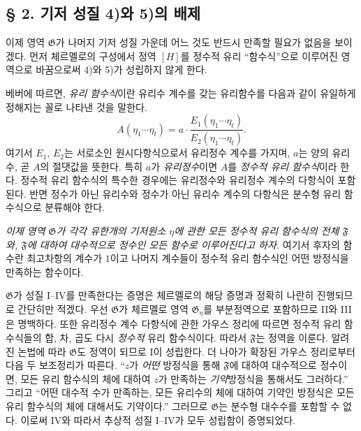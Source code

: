 \subsection*{§ 2. 기저 성질 4)와 5)의 배제}

이제 영역 $\mathfrak G$가 나머지 기저 성질 가운데 어느 것도 반드시 만족할 필요가 없음을 보이겠다. 먼저 체르멜로의 구성에서 정역 $[H]$를 정수적 유리 ``함수식''으로 이루어진 영역으로 바꿈으로써 4)와 5)가 성립하지 않게 한다.

베버에 따르면, \emph{유리 함수식}이란 유리수 계수를 갖는 유리함수를 다음과 같이 유일하게 정해지는 꼴로 나타낸 것을 말한다.
\[
 A(\eta_1\cdots \eta_t)
   = a\cdot\frac{E_1(\eta_1\cdots \eta_t)}{E_2(\eta_1\cdots \eta_t)}.
\]
여기서 $E_1$, $E_2$는 서로소인 원시다항식으로서 유리정수 계수를 가지며, $a$는 양의 유리수, 곧 $A$의 절댓값을 뜻한다. 특히 $a$가 \emph{유리정수}이면 $A$를 \emph{정수적 유리 함수식}이라 한다. 정수적 유리 함수식의 특수한 경우에는 유리정수와 유리정수 계수의 다항식이 포함된다. 반면 정수가 아닌 유리수와 정수가 아닌 유리수 계수의 다항식은 분수형 유리 함수식으로 분류해야 한다.

\emph{이제 영역 $\mathfrak G$가 각각 유한개의 기저원소 $\eta$에 관한 모든 정수적 유리 함수식의 전체 $\mathfrak F$와, $\mathfrak F$에 대하여 대수적으로 정수인 모든 함수로 이루어진다고 하자.} 여기서 후자의 함수란 최고차항의 계수가 $1$이고 나머지 계수들이 정수적 유리 함수식인 어떤 방정식을 만족하는 함수이다.

$\mathfrak G$가 성질 I--IV를 만족한다는 증명은 체르멜로의 해당 증명과 정확히 나란히 진행되므로 간단히만 적겠다. 우선 $\mathfrak G$가 체르멜로 영역 $\mathfrak G_\eta$를 부분정역으로 포함하므로 II와 III은 명백하다. 또한 유리정수 계수 다항식에 관한 가우스 정리에 따르면 정수적 유리 함수식들의 합, 차, 곱도 다시 \emph{정수적} 유리 함수식이다. 따라서 $\mathfrak F$는 정역을 이룬다. 알려진 논법에 따라 $\mathfrak G$도 정역이 되므로 I이 성립한다. 더 나아가 확장된 가우스 정리로부터 다음 두 보조정리가 따른다. ``$z$가 \emph{어떤} 방정식을 통해 $\mathfrak F$에 대하여 대수적으로 정수이면, 모든 유리 함수식의 체에 대하여 $z$가 만족하는 \emph{기약}방정식을 통해서도 그러하다.'' 그리고 ``어떤 대수적 수가 만족하는, 모든 유리수의 체에 대하여 기약인 방정식은 모든 유리 함수식의 체에 대해서도 기약이다.'' 그러므로 $\mathfrak G$는 분수형 대수수를 포함할 수 없다. 이로써 IV와 따라서 추상적 성질 I--IV가 모두 성립함이 증명되었다.

